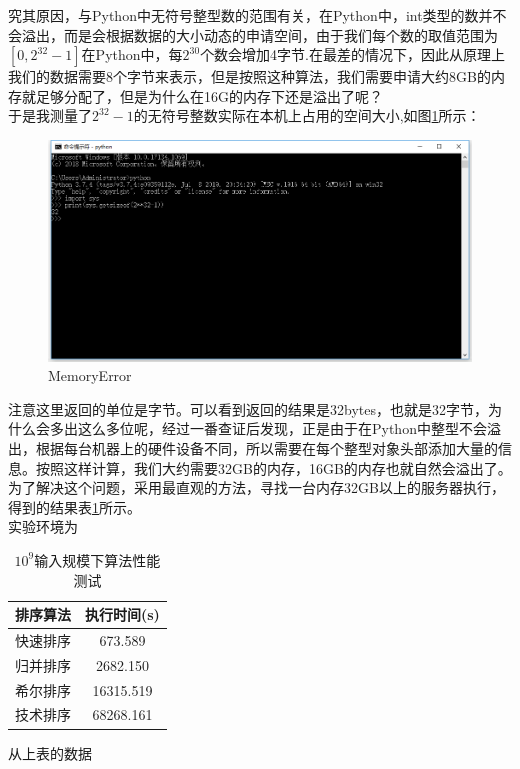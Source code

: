 \documentclass[UTF8]{ctexart}
\begin{document}
究其原因，与Python中无符号整型数的范围有关，在Python中，int类型的数并不会溢出，而是会根据数据的大小动态的申请空间，由于我们每个数的取值范围为$[0,2^{32}-1]$在Python中，每$2^{30}$个数会增加4字节.在最差的情况下，因此从原理上我们的数据需要8个字节来表示，但是按照这种算法，我们需要申请大约8GB的内存就足够分配了，但是为什么在16G的内存下还是溢出了呢？\\

于是我测量了$2^{32}-1$的无符号整数实际在本机上占用的空间大小,如图\ref{size}所示：

\begin{figure}[H]
    \centering
    \includegraphics[width=1\textwidth]{img/size.png}
    \caption{MemoryError}
    \label{size}
\end{figure}

注意这里返回的单位是字节。可以看到返回的结果是32bytes，也就是32字节，为什么会多出这么多位呢，经过一番查证后发现，正是由于在Python中整型不会溢出，根据每台机器上的硬件设备不同，所以需要在每个整型对象头部添加大量的信息。按照这样计算，我们大约需要32GB的内存，16GB的内存也就自然会溢出了。\\

为了解决这个问题，采用最直观的方法，寻找一台内存32GB以上的服务器执行，得到的结果表\ref{table-1}所示。\\
实验环境为

\begin{table}[H]
    \caption{$10^9$输入规模下算法性能测试}
    \label{table-1}
    \begin{center}
        \begin{tabular}{cc}
            \hline
            排序算法&   执行时间(s)\\     
            \hline
            快速排序&       673.589\\               
            归并排序&       2682.150\\              
            希尔排序&       16315.519\\             
            技术排序&      68268.161\\                      
            \hline
        \end{tabular}  
    \end{center}
\end{table}

从上表的数据
\end{document}
